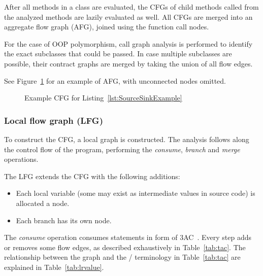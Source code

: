 After all methods in a class are evaluated,
the CFGs of child methods called from the analyzed methods
are lazily evaluated as well.
All CFGs are merged into an aggregate flow graph (AFG),
joined using the function call nodes.

For the case of OOP polymorphism,
call graph analysis is performed to identify
the exact subclasses that could be passed.
In case multiple subclasses are possible,
their contract graphs are merged by taking the union of all flow edges.

See Figure~\ref{fig:SourceSinkContract} for an example of AFG,
with unconnected nodes omitted.

\begin{figure}
	\caption{Example CFG for Listing~\ref{lst:SourceSinkExample}}
	\begin{center}
	\end{center}
	\label{fig:SourceSinkContract}
\end{figure}

\subsubsection{Local flow graph (LFG)}
To construct the CFG,
a local graph is constructed.
The analysis follows along the control flow of the program,
performing the \emph{consume}, \emph{branch} and \emph{merge} operations.

The LFG extends the CFG with the following additions:
\begin{itemize}
	\item Each local variable (some may exist as intermediate values in source code)
		is allocated a node.
	\item Each branch has its own  node.
\end{itemize}

The \emph{consume} operation consumes statements in form of 3AC~\cite{sootsurvivor}.
Every step adds or removes some flow edges,
as described exhaustively in Table~\ref{tab:tac}.
The relationship between the graph and the / terminology
in Table~\ref{tab:tac} are explained in Table~\ref{tab:lrvalue}.

